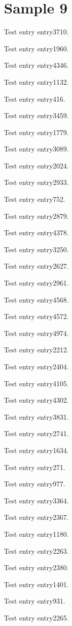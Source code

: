 \chapter{Sample 9}
Test entry \gls{entry3710}.

Test entry \gls{entry1960}.

Test entry \gls{entry4346}.

Test entry \gls{entry1132}.

Test entry \gls{entry416}.

Test entry \gls{entry3459}.

Test entry \gls{entry1779}.

Test entry \gls{entry3089}.

Test entry \gls{entry2024}.

Test entry \gls{entry2933}.

Test entry \gls{entry752}.

Test entry \gls{entry2879}.

Test entry \gls{entry4378}.

Test entry \gls{entry3250}.

Test entry \gls{entry2627}.

Test entry \gls{entry2961}.

Test entry \gls{entry4568}.

Test entry \gls{entry4572}.

Test entry \gls{entry4974}.

Test entry \gls{entry2212}.

Test entry \gls{entry2404}.

Test entry \gls{entry4105}.

Test entry \gls{entry4302}.

Test entry \gls{entry3831}.

Test entry \gls{entry2741}.

Test entry \gls{entry1634}.

Test entry \gls{entry271}.

Test entry \gls{entry977}.

Test entry \gls{entry3364}.

Test entry \gls{entry2367}.

Test entry \gls{entry1180}.

Test entry \gls{entry2263}.

Test entry \gls{entry2380}.

Test entry \gls{entry1401}.

Test entry \gls{entry931}.

Test entry \gls{entry2265}.

